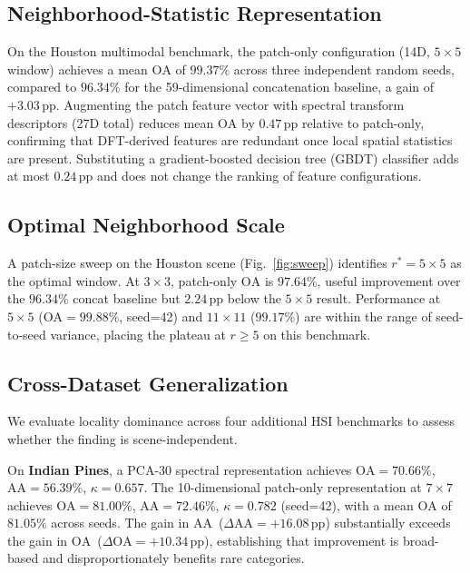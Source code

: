 \documentclass[journal]{IEEEtran}
\newcommand{\rstar}{r^{*}}
\newcommand{\pp}{\,\text{pp}}
\newcommand{\OA}{\ensuremath{\mathrm{OA}}}
\newcommand{\Acc}{\ensuremath{\mathrm{AA}}}  %
\begin{document}
\subsection{Neighborhood-Statistic Representation}

On the Houston multimodal benchmark, the patch-only configuration
(14D, $5{\times}5$ window) achieves a mean $\OA$ of $99.37\%$ across
three independent random seeds, compared to $96.34\%$ for the
59-dimensional concatenation baseline, a gain of $+3.03\pp$.
Augmenting the patch feature vector with spectral transform
descriptors (27D total) reduces mean $\OA$ by $0.47\pp$ relative to
patch-only, confirming that DFT-derived features are redundant once
local spatial statistics are present. Substituting a gradient-boosted
decision tree (GBDT) classifier adds at most $0.24\pp$ and does not
change the ranking of feature configurations.

\subsection{Optimal Neighborhood Scale}

A patch-size sweep on the Houston scene (Fig.~\ref{fig:sweep})
identifies $\rstar{=}5{\times}5$ as the optimal window. At
$3{\times}3$, patch-only $\OA$ is $97.64\%$, useful improvement
over the $96.34\%$ concat baseline but $2.24\pp$ below the
$5{\times}5$ result. Performance at $5{\times}5$ ($\OA{=}99.88\%$,
seed=42) and $11{\times}11$ ($99.17\%$) are within the range of
seed-to-seed variance, placing the plateau at $r \geq 5$ on this
benchmark.

\subsection{Cross-Dataset Generalization}

We evaluate locality dominance across four additional HSI benchmarks
to assess whether the finding is scene-independent.

On \textbf{Indian Pines}, a PCA-30 spectral representation achieves
$\OA{=}70.66\%$, $\Acc{=}56.39\%$, $\kappa{=}0.657$. The 10-dimensional
patch-only representation at $7{\times}7$ achieves $\OA{=}81.00\%$,
$\Acc{=}72.46\%$, $\kappa{=}0.782$ (seed=42), with a mean $\OA$ of
$81.05\%$ across seeds. The gain in \Acc\ ($\Delta\Acc{=}+16.08\pp$)
substantially exceeds the gain in \OA\ ($\Delta\OA{=}+10.34\pp$),
establishing that improvement is broad-based and disproportionately
benefits rare categories.
\end{document}
